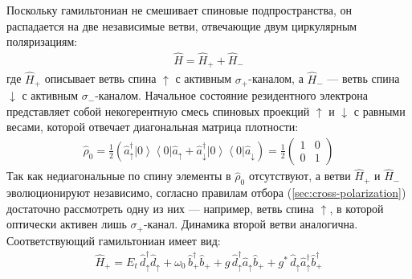 \documentclass[11pt]{article}    %
\numberwithin{equation}{section}
\begin{document}
Поскольку гамильтониан не смешивает спиновые подпространства, он
распадается на две независимые ветви, отвечающие двум циркулярным
поляризациям:
\begin{gather}
    \hat{H} = \hat{H}_{+} + \hat{H}_{-}
\end{gather}
где $\hat{H}_{+}$ описывает ветвь спина $\uparrow$ с активным
$\sigma_+$-каналом, а $\hat{H}_{-}$ --- ветвь спина $\downarrow$ с
активным $\sigma_-$-каналом. Начальное состояние резидентного
электрона представляет собой некогерентную смесь спиновых проекций
$\uparrow$ и $\downarrow$ с равными весами, которой отвечает
диагональная матрица плотности:
\begin{gather}
    \hat{\rho}_0 = \frac{1}{2} \left(
    \hat{a}^{\dag}_{\uparrow} \left| 0 \right\rangle\!\left\langle 0 \right| \hat{a}_{\uparrow}
    + \hat{a}^{\dag}_{\downarrow} \left| 0 \right\rangle\!\left\langle 0 \right| \hat{a}_{\downarrow}
    \right)
    = \frac{1}{2} \begin{pmatrix} 1 & 0 \\ 0 & 1 \end{pmatrix}
\end{gather}
Так как недиагональные по спину элементы в $\hat{\rho}_0$ отсутствуют,
а ветви $\hat{H}_{+}$ и $\hat{H}_{-}$ эволюционируют независимо,
согласно правилам отбора (\ref{sec:cross-polarization}) достаточно
рассмотреть одну из них --- например, ветвь спина $\uparrow$, в
которой оптически активен лишь $\sigma_+$-канал.
Динамика второй ветви аналогична.
Соответствующий гамильтониан имеет вид:
\begin{gather}
    \hat{H}_{+} = E_t \, \hat{d}^{\dag}_{\uparrow} \hat{d}_{\uparrow}
    + \omega_0 \, \hat{b}^{\dag}_{+} \hat{b}_{+}
    + g \, \hat{d}^{\dag}_{\uparrow} \hat{a}_{\uparrow} \hat{b}_{+}
    + g^{*} \, \hat{d}_{\uparrow} \hat{a}^{\dag}_{\uparrow} \hat{b}^{\dag}_{+}
\end{gather}
\end{document}
